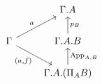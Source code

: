\[\begin{tikzcd}
	& {\Gamma.A} \\
	\Gamma & {\Gamma.A.B} \\
	& {\Gamma.A.(\Pi_{A}B)}
	\arrow["{(a,f)}"', from=2-1, to=3-2]
	\arrow["{\app_{A,B}}"', from=3-2, to=2-2]
	\arrow["{p_{B}}"', from=2-2, to=1-2]
	\arrow["a", from=2-1, to=1-2]
\end{tikzcd}\]